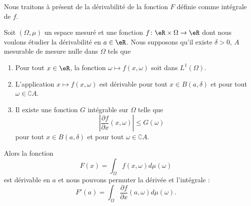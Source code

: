 Nous traitons à présent de la dérivabilité de la fonction \( F\) définie comme intégrale de \( f\).

\begin{theorem}    \label{ThoMWpRKYp}
    Soit \( (\Omega,\mu)\) un espace mesuré et une fonction \( f\colon \eR\times \Omega\to \eR\) dont nous voulons étudier la dérivabilité en \(a\in \eR\). Nous supposons qu'il existe \( \delta>0\), \( A\) mesurable de mesure nulle dans \( \Omega\) tels que
    \begin{enumerate}
        \item   \label{ITEMooAFVMooAeCEco}
           Pour tout \( x\in \eR\), la fonction \( \omega\mapsto f(x,\omega)\) soit dans \( L^1(\Omega)\).
       \item       \label{ITEMooXIZXooGPYFyT}
            L'application \( x\mapsto f(x,\omega)\) est dérivable pour tout \( x\in B(a,\delta)\) et pour tout \( \omega\in \complement A\).
        \item   \label{ITEMooDTTIooWkldfB}
            Il existe une fonction \( G\) intégrable sur \( \Omega\) telle que
            \begin{equation}
                \left| \frac{ \partial f }{ \partial x }(x,\omega) \right| \leq G(\omega)
            \end{equation}
            pour tout \( x\in B(a,\delta)\) et pour tout \( \omega\in\complement A\).
    \end{enumerate}
    Alors la fonction
    \begin{equation}
        F(x)=\int_{\Omega}f(x,\omega)d\mu(\omega)
    \end{equation}
    est dérivable en \( a\) et nous pouvons permuter la dérivée et l'intégrale :
    \begin{equation}
        F'(a)=\int_{\Omega}\frac{ \partial f }{ \partial x }(a,\omega)d\mu(\omega).
    \end{equation}
\end{theorem}

